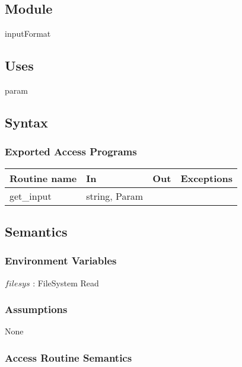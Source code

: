 \documentclass[12pt,fleqn]{article}
\begin{document}
\subsection*{Module}

inputFormat

\subsection* {Uses}

param

\subsection* {Syntax}

\subsubsection* {Exported Access Programs}

\begin{tabular}{| l | l | l | l |}
\hline
\textbf{Routine name} & \textbf{In} & \textbf{Out} & \textbf{Exceptions}\\
\hline
get\_input & string, Param &  & ~\\
\hline

\end{tabular}

\subsection* {Semantics}

\subsubsection*{Environment Variables}
$filesys$ : FileSystem Read

\subsubsection* {Assumptions}
None

\subsubsection* {Access Routine Semantics}
\end{document}
